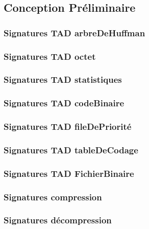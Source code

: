\subsection{Conception Préliminaire}

\subsubsection{Signatures TAD arbreDeHuffman}


\subsubsection{Signatures TAD octet}
%

\subsubsection{Signatures TAD statistiques}
%

\subsubsection{Signatures TAD codeBinaire}
%

\subsubsection{Signatures TAD fileDePriorité}
%

\subsubsection{Signatures TAD tableDeCodage}
%

\subsubsection{Signatures TAD FichierBinaire}
%

\subsubsection{Signatures compression}


\subsubsection{Signatures décompression}

